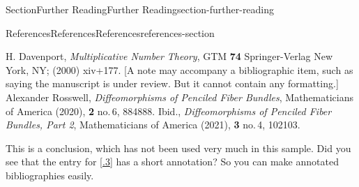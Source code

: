 \documentclass[twoside,10pt,]{article}
\newcommand{\xreffont}{\relax}
\numberwithin{equation}{section}
\begin{document}
\begin{sectionptx}{Section}{Further Reading}{}{Further Reading}{}{}{section-further-reading}
\begin{references-subsection}{References}{References}{}{References}{}{}{references-section}
\begin{referencelist}
\hypertarget{Dav}{}H. Davenport, \textit{Multiplicative Number Theory}, GTM \textbf{74} Springer-Verlag New York, NY; (2000) xiv+177. [A note may accompany a bibliographic item, such as saying the manuscript is under review.  But it cannot contain any formatting.]
\hypertarget{biblio-rosswell-fictional}{}Alexander Rosswell, \textit{Diffeomorphisms of Penciled Fiber Bundles}, Mathematicians of America (2020), \textbf{2} no.\@\,6, 884\textendash{}888.
\hypertarget{biblio-rosswell-fictional-two}{}Ibid.\@, \textit{Diffeomorphisms of Penciled Fiber Bundles, Part 2}, Mathematicians of America (2021), \textbf{3} no.\@\,4, 102\textendash{}103.
\end{referencelist}
\begin{conclusion}{}%
This is a conclusion, which has not been used very much in this sample.  Did you see that the entry for \hyperlink{biblio-beezer-fcla}{[{\xreffont 11.4.3}]} has a short annotation?  So you can make annotated bibliographies easily.%
\end{conclusion}%
\end{references-subsection}
\end{sectionptx}
%
%
\typeout{************************************************}
\typeout{************************************************}
%
\end{document}
